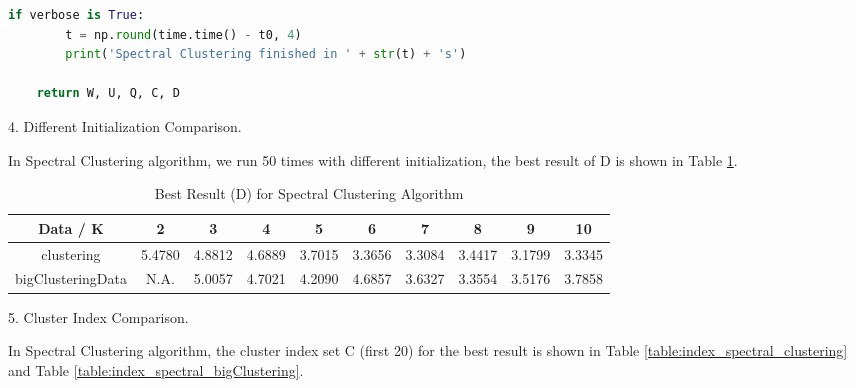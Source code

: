 \begin{description}
\begin{description}
\begin{lstlisting}[language=Python, caption=Spectral Clustering Algorithm Python Code]
    if verbose is True:
        t = np.round(time.time() - t0, 4)
        print('Spectral Clustering finished in ' + str(t) + 's')

    return W, U, Q, C, D
\end{lstlisting}

\item{4.} Different Initialization Comparison.

In Spectral Clustering algorithm, we run 50 times with different initialization, the best result of D is shown in Table \ref{table:best_spectral}.

\begin{table}[H]
	\centering
	\caption{Best Result (D) for Spectral Clustering Algorithm}
	\label{table:best_spectral}	
	\begin{tabular}{ c | c | c | c | c | c | c | c | c | c}
		\hline \hline
		Data / K      & 2     &    3    & 4    & 5     & 6    & 7    & 8   & 9    & 10 \\[0.1cm]
		\hline
	clustering	        & 5.4780 &    4.8812 & 4.6889 & 3.7015 & 3.3656 & 3.3084 & 3.4417 & 3.1799 & 3.3345 \\[0.1cm]
bigClusteringData & N.A. &    5.0057 & 4.7021 & 4.2090 & 4.6857 & 3.6327 & 3.3554 & 3.5176 & 3.7858 \\[0.1cm]
		\hline	
	\end{tabular}
\end{table}

\item{5.} Cluster Index Comparison.

In Spectral Clustering algorithm, the cluster index set C (first 20) for the best result is shown in Table \ref{table:index_spectral_clustering} and Table \ref{table:index_spectral_bigClustering}.


\end{description}
\end{description}
